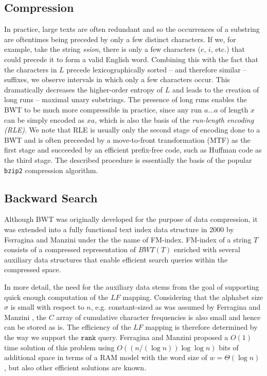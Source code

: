 \subsection{Compression}
\label{subseq:bwt_compression}
In practice, large texts are often redundant and so the occurrences of a substring are oftentimes being preceded by only a few distinct characters. If we, for example, take the string \textit{ssion}, there is only a few characters ($e$, $i$, etc.) that could precede it to form a valid English word. Combining this with the fact that the characters in $L$ precede lexicographically sorted -- and therefore similar -- suffixes, we observe intervals in which only a few characters occur. This dramatically decreases the higher-order entropy of $L$ and leads to the creation of long runs -- maximal unary substrings. The presence of long runs enables the BWT to be much more compressible in practice, since any run $a\ldots a$ of length $x$ can be simply encoded as $xa$, which is also the basis of the \textit{run-length encoding (RLE)}. We note that RLE is usually only the second stage of encoding done to a BWT and is often preceeded by a move-to-front transformation (MTF) \cite{ryabko1980data, bentley1986locally} as the first stage and succeeded by an efficient prefix-free code, such as Huffman code \cite{burrows1994block} as the third stage. The described procedure is essentially the basis of the popular \texttt{bzip2} \cite{seward1996bzip2} compression algorithm.

\subsection{Backward Search}
\label{subseq:bwt_backward_search}
Although BWT was originally developed for the purpose of data compression, it was extended into a fully functional text index data structure in 2000 by Ferragina and Manzini \cite{fmindex2000manzini} under the the name of FM-index. FM-index of a string $T$ consists of a compressed representation of $BWT(T)$ enriched with several auxiliary data structures that enable efficient search queries within the compressed space.

In more detail, the need for the auxiliary data stems from the goal of supporting quick enough computation of the $LF$ mapping. Considering that the alphabet size $\sigma$ is small with respect to $n$, e.g. constant-sized as was assumed by Ferragina and Manzini \cite{fmindex2000manzini}, the $C$ array of cumulative character frequencies is also small and hence can be stored as is. The efficiency of the $LF$ mapping is therefore determined by the way we support the $\texttt{rank}$ query. Ferragina and Manzini proposed a $O(1)$ time solution of this problem using $O((n/(\log n)) \log \log n)$ bits of additional space in terms of a RAM model with the word size of $w = \Theta(\log n)$ \cite{fmindex2000manzini}, but also other efficient solutions are known.

